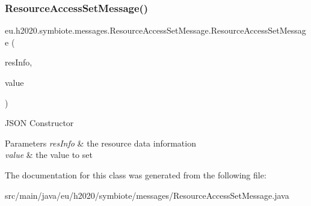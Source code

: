 \subsubsection{\texorpdfstring{Resource\+Access\+Set\+Message()}{ResourceAccessSetMessage()}}
{\footnotesize\ttfamily eu.\+h2020.\+symbiote.\+messages.\+Resource\+Access\+Set\+Message.\+Resource\+Access\+Set\+Message (\begin{DoxyParamCaption}\item[{@Json\+Property(\char`\"{}resource\+Info\char`\"{}) Resource\+Info}]{res\+Info,  }\item[{@Json\+Property(\char`\"{}value\char`\"{}) Observation\+Value}]{value }\end{DoxyParamCaption})}

J\+S\+ON Constructor 
\begin{DoxyParams}{Parameters}
{\em res\+Info} & the resource data information \\
\hline
{\em value} & the value to set \\
\hline
\end{DoxyParams}


The documentation for this class was generated from the following file\+:\begin{DoxyCompactItemize}
\item 
src/main/java/eu/h2020/symbiote/messages/Resource\+Access\+Set\+Message.\+java\end{DoxyCompactItemize}
